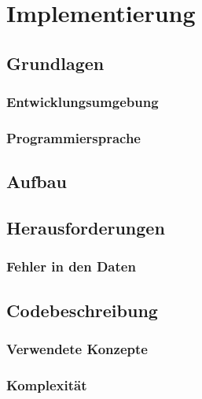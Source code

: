 \chapter{Implementierung}
\label{chapter4}


\section{Grundlagen}
\label{chapter4-Grundlagen}


\subsection{Entwicklungsumgebung}
\label{chapter4-Entwicklungsumgebung}

\subsection{Programmiersprache}
\label{chapter4-Programmiersprache}


\section{Aufbau}
\label{chapter4-Aufbau}


\section{Herausforderungen}
\label{chapter4-Herausforderungen}

\subsection{Fehler in den Daten}
\label{chapter4-FehlerDaten}


\section{Codebeschreibung}
\label{chapter4-Codebeschreibung}

\subsection{Verwendete Konzepte}
\label{chapter4-VerwendeteKonzepte}

\subsection{Komplexität}
\label{chapter4-Komplexität}